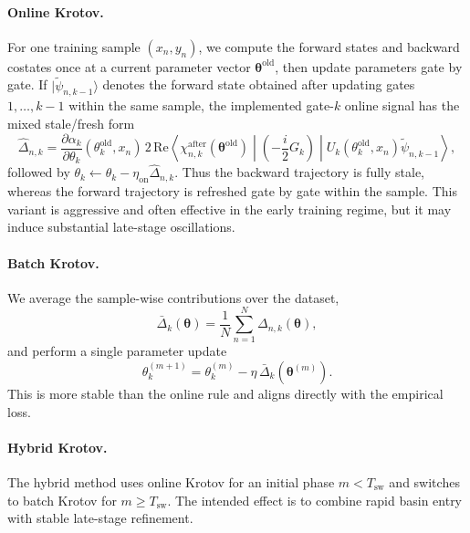 \documentclass[aps,prb,10pt,twocolumn,superscriptaddress]{revtex4-2}
\begin{document}
\paragraph{Online Krotov.}
For one training sample \((x_n,y_n)\), we compute the forward states and backward costates once at a current parameter vector \(\bm{\theta}^{\mathrm{old}}\), then update parameters gate by gate. If \(|\tilde{\psi}_{n,k-1}\rangle\) denotes the forward state obtained after updating gates \(1,\dots,k-1\) within the same sample, the implemented gate-\(k\) online signal has the mixed stale/fresh form
\begin{equation}
\widehat{\Delta}_{n,k}
=
\frac{\partial \alpha_k}{\partial \theta_k}(\theta_k^{\mathrm{old}},x_n)\,
2\,\mathrm{Re}\!\left\langle
\chi_{n,k}^{\mathrm{after}}(\bm{\theta}^{\mathrm{old}})
\middle|
\left(-\frac{i}{2}G_k\right)
\middle|
U_k(\theta_k^{\mathrm{old}},x_n)\tilde{\psi}_{n,k-1}
\right\rangle,
\label{eq:online_mixed_signal}
\end{equation}
followed by \(\theta_k \leftarrow \theta_k-\eta_{\mathrm{on}}\widehat{\Delta}_{n,k}\). Thus the backward trajectory is fully stale, whereas the forward trajectory is refreshed gate by gate within the sample. This variant is aggressive and often effective in the early training regime, but it may induce substantial late-stage oscillations.

\paragraph{Batch Krotov.}
We average the sample-wise contributions over the dataset,
\begin{equation}
\bar{\Delta}_k(\bm{\theta})
=
\frac{1}{N}\sum_{n=1}^N \Delta_{n,k}(\bm{\theta}),
\label{eq:batch_direction}
\end{equation}
and perform a single parameter update
\begin{equation}
\theta_k^{(m+1)}=\theta_k^{(m)}-\eta\,\bar{\Delta}_k(\bm{\theta}^{(m)}).
\label{eq:batch_update}
\end{equation}
This is more stable than the online rule and aligns directly with the empirical loss.

\paragraph{Hybrid Krotov.}
The hybrid method uses online Krotov for an initial phase \(m<T_{\mathrm{sw}}\) and switches to batch Krotov for \(m\geq T_{\mathrm{sw}}\). The intended effect is to combine rapid basin entry with stable late-stage refinement.
\end{document}
